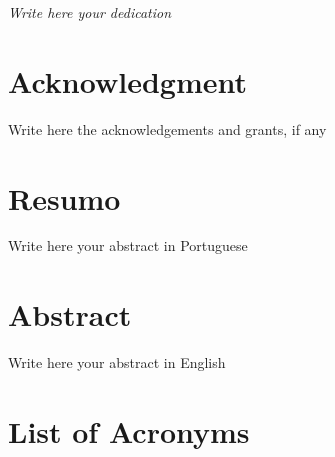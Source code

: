 \documentclass[12pt,reqno, twoside]{amsbook}
\numberwithin{figure}{chapter}
\numberwithin{table}{chapter}
\theoremstyle{plain}
\numberwithin{equation}{chapter}
\newenvironment{dedication}
  {%
   \thispagestyle{empty}%
   \vspace*{\stretch{1}}%
   \itshape             %
   \raggedleft          %
  }
  {\par %
   \vspace{\stretch{3}} %
  }
\numberwithin{section}{chapter}
\begin{document}
\frontmatter
{}
\thispagestyle{empty}

\begin{dedication}%

\begin{flushright}
\textit{Write here your dedication}
\end{flushright}%
\end{dedication}

\setcounter{page}{1}
\chapter*{Acknowledgment}

Write here the acknowledgements and grants, if any

\chapter*{Resumo}

Write here your abstract in Portuguese

\chapter*{Abstract}

Write here your abstract in English


\tableofcontents

\listoffigures

\listoftables
\cleardoublepage

\chapter*{List of Acronyms}
%
    \begin{acronym}
    \end{acronym}
\end{document}
